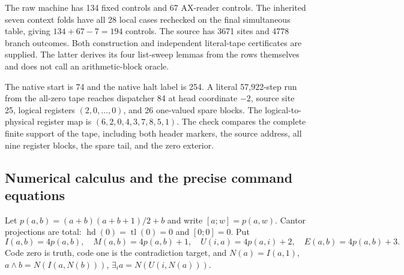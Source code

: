 The raw machine has 134 fixed controls and 67 AX-reader controls.
The inherited seven context folds have all 28 local cases rechecked on
the final simultaneous table, giving $134+67-7=194$ controls.
The source has 3671 sites and 4778 branch outcomes. Both construction
and independent literal-tape certificates are supplied. The latter
derives its four list-sweep lemmas from the rows themselves and does not
call an arithmetic-block oracle.

The native start is 74 and the native halt label is 254. A literal
57,922-step run from the all-zero tape reaches dispatcher 84 at head
coordinate $-2$, source site 25, logical registers $(2,0,\ldots,0)$,
and 26 one-valued spare blocks. The logical-to-physical register map is
$(6,2,0,4,3,7,8,5,1)$. The check compares the complete finite support of
the tape, including both header markers, the source address, all nine
register blocks, the spare tail, and the zero exterior.

\subsection{Numerical calculus and the precise command equations}

Let $p(a,b)=(a+b)(a+b+1)/2+b$ and write $[a;w]=p(a,w)$.
Cantor projections are total: $\operatorname{hd}(0)=\operatorname{tl}(0)=0$
and $[0;0]=0$. Put
\[
 I(a,b)=4p(a,b),\quad M(a,b)=4p(a,b)+1,\quad
 U(i,a)=4p(a,i)+2,\quad E(a,b)=4p(a,b)+3.
\]
Code zero is truth, code one is the contradiction target, and
$N(a)=I(a,1)$, $a\wedge b=N(I(a,N(b)))$,
$\exists_i a=N(U(i,N(a)))$.

